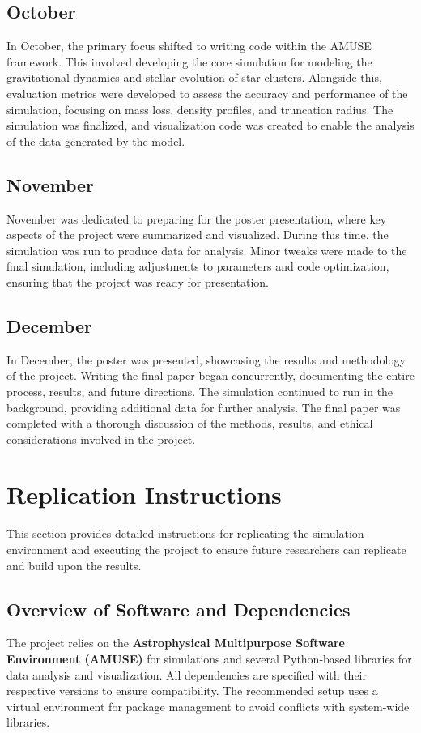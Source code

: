 \documentclass[10pt,twocolumn]{article}
\begin{document}
\subsection*{October}
In October, the primary focus shifted to writing code within the AMUSE framework. This involved developing the core simulation for modeling the gravitational dynamics and stellar evolution of star clusters. Alongside this, evaluation metrics were developed to assess the accuracy and performance of the simulation, focusing on mass loss, density profiles, and truncation radius. The simulation was finalized, and visualization code was created to enable the analysis of the data generated by the model.

\subsection*{November}
November was dedicated to preparing for the poster presentation, where key aspects of the project were summarized and visualized. During this time, the simulation was run to produce data for analysis. Minor tweaks were made to the final simulation, including adjustments to parameters and code optimization, ensuring that the project was ready for presentation.

\subsection*{December}
In December, the poster was presented, showcasing the results and methodology of the project. Writing the final paper began concurrently, documenting the entire process, results, and future directions. The simulation continued to run in the background, providing additional data for further analysis. The final paper was completed with a thorough discussion of the methods, results, and ethical considerations involved in the project.

\appendix

\section{Replication Instructions}

This section provides detailed instructions for replicating the simulation environment and executing the project to ensure future researchers can replicate and build upon the results.

\subsection{Overview of Software and Dependencies}
The project relies on the \textbf{Astrophysical Multipurpose Software Environment (AMUSE)} for simulations and several Python-based libraries for data analysis and visualization. All dependencies are specified with their respective versions to ensure compatibility. The recommended setup uses a virtual environment for package management to avoid conflicts with system-wide libraries.
\end{document}
